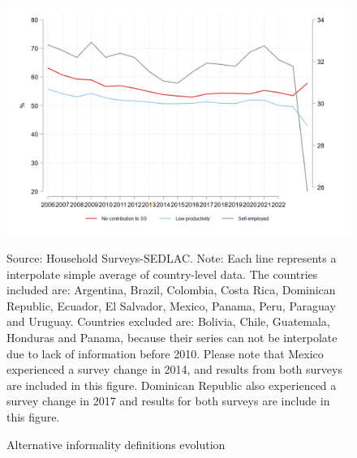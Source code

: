 \documentclass[english]{article}
\begin{document}
\begin{itemize}
              \begin{figure}[H]
                \justifying
                \caption{Alternative informality definitions evolution}  
                \centerline{\includegraphics[scale=.3]{latex/figures/Evolution/LAC_informalitydefs_v2.png}}
                \label{fig:info_defevolution}
                \footnotesize{Source: Household Surveys-SEDLAC.}
                \footnotesize{Note: Each line represents a interpolate simple average of country-level data. The countries included are: Argentina, Brazil, Colombia, Costa Rica, Dominican Republic, Ecuador, El Salvador, Mexico, Panama, Peru, Paraguay and Uruguay. Countries excluded are: Bolivia, Chile, Guatemala, Honduras and Panama, because their series can not be interpolate due to lack of information before 2010. Please note that Mexico experienced a survey change in 2014, and results from both surveys are included in this figure. Dominican Republic also experienced a survey change in 2017 and results for both surveys are include in this figure.}
             \end{figure}


\end{itemize}
\end{document}
